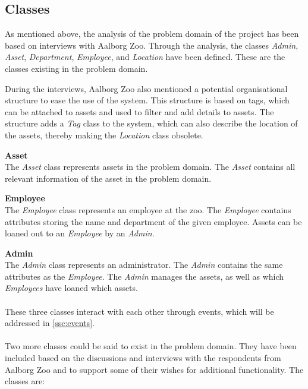 \subsection{Classes}\label{ssc:classes}

As mentioned above, the analysis of the problem domain of the project has been based on interviews with Aalborg Zoo. Through the analysis, the classes \textit{Admin}, \textit{Asset}, \textit{Department}, \textit{Employee}, and \textit{Location} have been defined. These are the classes existing in the problem domain.
\par
During the interviews, Aalborg Zoo also mentioned a potential organisational structure to ease the use of the system. This structure is based on tags, which can be attached to assets and used to filter and add details to assets. The structure adds a \textit{Tag} class to the system, which can also describe the location of the assets, thereby making the \textit{Location} class obsolete.
\par

\textbf{Asset}\\
The \textit{Asset} class represents assets in the problem domain. The \textit{Asset} contains all relevant information of the asset in the problem domain.
\par

\textbf{Employee}\\
The \textit{Employee} class represents an employee at the zoo. The \textit{Employee} contains attributes storing the name and department of the given employee. Assets can be loaned out to an \textit{Employee} by an \textit{Admin}.
\par

\textbf{Admin}\\
The \textit{Admin} class represents an administrator. The \textit{Admin} contains the same attributes as the \textit{Employee}. The \textit{Admin} manages the assets, as well as which \textit{Employees} have loaned which assets.
\\\\
These three classes interact with each other through events, which will be addressed in \autoref{ssc:events}.
\\\\
Two more classes could be said to exist in the problem domain. They have been included based on the discussions and interviews with the respondents from Aalborg Zoo and to support some of their wishes for additional functionality. The classes are:
\par

